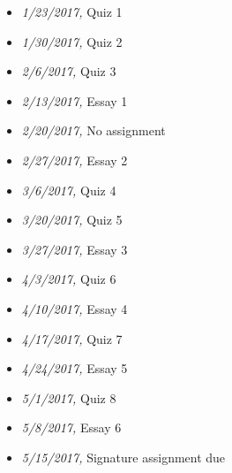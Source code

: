 \documentclass[article,oneside]{memoir}
\begin{document}
\begin{itemize}
\item \textit{1/23/2017,} Quiz 1 
\item \textit{1/30/2017,} Quiz 2
\item \textit{2/6/2017,} Quiz 3
\item \textit{2/13/2017,} Essay 1
\item \textit{2/20/2017,} No assignment
\item \textit{2/27/2017,} Essay 2
\item \textit{3/6/2017,}  Quiz 4
\item \textit{3/20/2017,} Quiz 5
\item \textit{3/27/2017,}  Essay 3
\item \textit{4/3/2017,} Quiz 6
\item \textit{4/10/2017,} Essay 4
\item \textit{4/17/2017,} Quiz 7
\item \textit{4/24/2017,} Essay 5
\item \textit{5/1/2017,} Quiz 8
\item \textit{5/8/2017,} Essay 6
\item \textit{5/15/2017,} Signature assignment due
\end{itemize}



\end{document}
